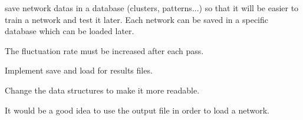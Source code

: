 
\begin{DoxyRefList}
\item[\label{todo__todo000005}%
\hypertarget{todo__todo000005}{}%
page \hyperlink{index}{A\-R\-T1 project introduction} ]save network datas in a database (clusters, patterns...) so that it will be easier to train a network and test it later. Each network can be saved in a specific database which can be loaded later.  
\item[\label{todo__todo000001}%
\hypertarget{todo__todo000001}{}%
File \hyperlink{art1_8c}{art1.c} ]The fluctuation rate must be increased after each pass.  
\item[\label{todo__todo000002}%
\hypertarget{todo__todo000002}{}%
File \hyperlink{io_8c}{io.c} ]Implement save and load for results files. 
\item[\label{todo__todo000004}%
\hypertarget{todo__todo000004}{}%
File \hyperlink{main_8c}{main.c} ]Change the data structures to make it more readable.  
\item[\label{todo__todo000003}%
\hypertarget{todo__todo000003}{}%
Global \hyperlink{io_8h_a72d8ceea6208425220d76bc1d02b7498}{write\-\_\-train\-\_\-results} (Vector $\ast$$\ast$clusts\-Classes, \hyperlink{struct_in_param}{In\-Param} par, ulong empty\-Pats, float fluc, Vector $\ast$pats, ulong n\-Pats, Vector $\ast$clusts, Vector $\ast$pats\-Class)]It would be a good idea to use the output file in order to load a network.
\end{DoxyRefList}